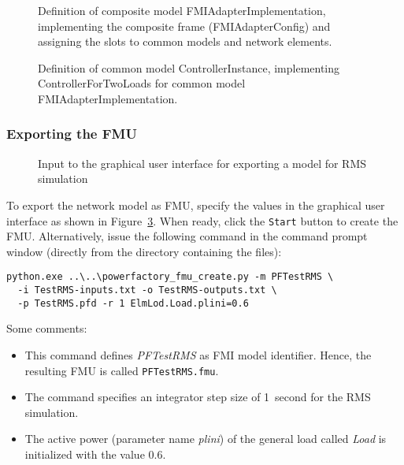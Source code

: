 \begin{figure}[h!]
\vspace*{2em}
\caption{Definition of composite model FMIAdapterImplementation, implementing the composite frame (FMIAdapterConfig) and assigning the slots to common models and network elements.}
\label{fig:fmiadapterconfig_composite_model}
\end{figure}

\newpage

\begin{figure}[h!]
\vspace*{2em}
\caption{Definition of common model ControllerInstance, implementing \dslmodel ControllerForTwoLoads for common model FMIAdapterImplementation.}
\label{fig:controllerinstance}
\end{figure}

\subsubsection*{Exporting the FMU}

\begin{figure}[h!]
\vspace*{1em}
\caption{Input to the graphical user interface for exporting a model for RMS simulation}
\label{fig:gui_create_rms}
\end{figure}

To export the network model as FMU, specify the values in the graphical user interface as shown in Figure~\ref{fig:gui_create_rms}.
When ready, click the \texttt{Start} button to create the FMU.
Alternatively, issue the following command in the command prompt window (directly from the directory  containing the files):
\begin{verbatim}
python.exe ..\..\powerfactory_fmu_create.py -m PFTestRMS \
  -i TestRMS-inputs.txt -o TestRMS-outputs.txt \
  -p TestRMS.pfd -r 1 ElmLod.Load.plini=0.6
\end{verbatim}
Some comments:
\begin{itemize}
  \item This command defines \emph{PFTestRMS} as FMI model identifier.
  Hence, the resulting FMU is called \texttt{PFTestRMS.fmu}.
  \item The command specifies an integrator step size of 1~second for the RMS simulation.
  \item The active power (parameter name \emph{plini}) of the general load called \emph{Load} is initialized with the value $0.6$.
\end{itemize}


